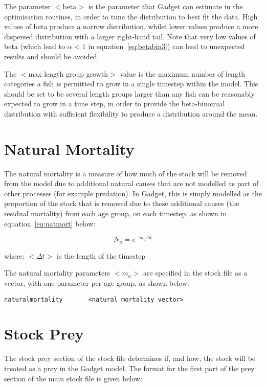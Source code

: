 \documentclass[10pt,twoside]{book}
\begin{document}
The parameter $<$beta$>$ is the parameter that Gadget can estimate in the optimisation routines, in order to tune the distribution to best fit the data.  High values of beta produce a narrow distribution, whilst lower values produce a more dispersed distribution with a larger right-hand tail.  Note that very low values of beta (which lead to $\alpha$ < 1 in equation~\ref{eq:betabin3}) can lead to unexpected results and should be avoided.

\bigskip
The $<$max length group growth$>$ value is the maximum number of length categories a fish is permitted to grow in a single timestep within the model.  This should be set to be several length groups larger than any fish can be reasonably expected to grow in a time step, in order to provide the beta-binomial distribution with sufficient flexibility to produce a distribution around the mean.

\section{Natural Mortality}\label{sec:stocknatmort}
The natural mortality is a measure of how much of the stock will be removed from the model due to additional natural causes that are not modelled as part of other processes (for example predation).  In Gadget, this is simply modelled as the proportion of the stock that is removed due to these additional causes (the residual mortality) from each age group, on each timestep, as shown in equation~\ref{eq:natmort} below:

\begin{equation}\label{eq:natmort}
N_{a} = e^{-m_{a} \Delta t}
\end{equation}

where:\newline
$<\Delta t>$ is the length of the timestep

\bigskip
The natural mortality parameters $<m_{a}>$ are specified in the stock file as a vector, with one parameter per age group, as shown below:

{\small\begin{verbatim}
naturalmortality       <natural mortality vector>
\end{verbatim}}

\section{Stock Prey}\label{sec:stockprey}
The stock prey section of the stock file determines if, and how, the stock will be treated as a prey in the Gadget model.  The format for the first part of the prey section of the main stock file is given below:
\end{document}
